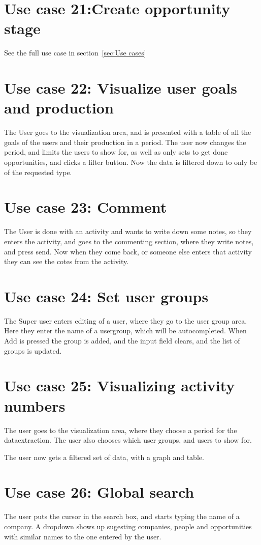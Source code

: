\section{Use case 21:Create opportunity stage }
See the full use case in section~\ref{sec:Use cases}

\section{Use case 22: Visualize user goals and production}
\label{app:usecase:visualizegoalsproduction}
The User goes to the visualization area, and is presented with a table of all
the goals of the users and their production in a period. The user now changes
the period, and limits the users to show for, as well as only sets to get done
opportunities, and clicks a filter button. Now the data is filtered down to only
be of the requested type. 

\section{Use case 23: Comment}
The User is done with an activity and wants to write down some notes, so they
enters the activity, and goes to the commenting section, where they write notes,
and press send. Now when they come back, or someone else enters that activity
they can see the cotes from the activity. 

\section{Use case 24: Set user groups }
The Super user enters editing of a user, where they go to the user group area.
Here they enter the name of a usergroup, which will be autocompleted. When Add
is pressed the group is added, and the input field clears, and the list of
groups is updated.

\section{Use case 25:  Visualizing activity numbers}
The user goes to the visualization area, where they choose a period for the
dataextraction. The user also chooses which user groups, and users to show for.

The user now gets a filtered set of data, with a graph and table.

\section{Use case 26: Global search}
The user puts the cursor in the search box, and starts typing the name of a
company. A dropdown shows up sugesting companies, people and opportunities with
similar names to the one entered by the user.

